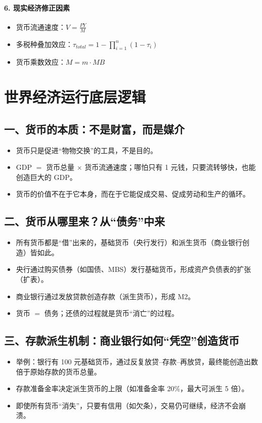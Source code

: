 \paragraph{6. 现实经济修正因素}
\begin{itemize}[nosep]
    \item 货币流通速度：$V = \frac{PY}{M}$
    \item 多税种叠加效应：$\tau_{total} = 1 - \prod_{i=1}^n (1-\tau_i)$
    \item 货币乘数效应：$M = m \cdot MB$
\end{itemize}

\newpage

\section{世界经济运行底层逻辑}
\subsection{一、货币的本质：不是财富，而是媒介}
\begin{itemize}[nosep]
  \item 货币只是促进“物物交换”的工具，不是目的。
  \item GDP $=$ 货币总量 $\times$ 货币流通速度；哪怕只有 1 元钱，只要流转够快，也能创造巨大的 GDP。
  \item 货币的价值不在于它本身，而在于它能促成交易、促成劳动和生产的循环。
\end{itemize}

\subsection{二、货币从哪里来？从“债务”中来}
\begin{itemize}[nosep]
  \item 所有货币都是“借”出来的，基础货币（央行发行）和派生货币（商业银行创造）皆如此。
  \item 央行通过购买债券（如国债、MBS）发行基础货币，形成资产负债表的扩张（扩表）。
  \item 商业银行通过发放贷款创造存款（派生货币），形成 M2。
  \item 货币 $=$ 债务；还债的过程就是货币“消亡”的过程。
\end{itemize}

\subsection{三、存款派生机制：商业银行如何“凭空”创造货币}
\begin{itemize}[nosep]
  \item 举例：银行有 100 元基础货币，通过反复放贷--存款--再放贷，最终能创造出数倍于原始存款的货币总量。
  \item 存款准备金率决定派生货币的上限（如准备金率 20\%，最大可派生 5 倍）。
  \item 即使所有货币“消失”，只要有信用（如欠条），交易仍可继续，经济不会崩溃。
\end{itemize}

